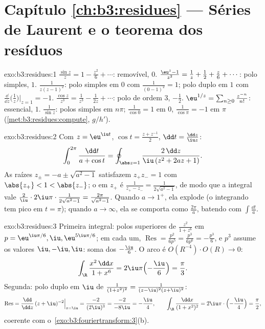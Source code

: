 \section*{Capítulo \ref{ch:b3:residues} --- Séries de Laurent e
o teorema dos resíduos}

\begin{solution}{exo:b3:residues:1}
$\frac{\sin z}z = 1 - \frac{z^2}6 + \cdots$: removível,
 $0$. $\frac{\eu^z - 1}{z^2} = \frac1z + \frac12 +
\frac z6 + \cdots$: polo simples,  $1$.
$\frac1{z(z-1)^2}$: polo simples em $0$ com 
$\frac1{(0-1)^2} = 1$; polo duplo em $1$ com 
$\frac{\dd}{\dd z}\bigl(\frac1z\bigr)\big|_{z=1} = -1$.
$\frac{\cos z}{z^3} = \frac1{z^3} - \frac1{2z} + \cdots$: polo
de ordem $3$,  $-\frac12$. $\eu^{1/z} = \sum_{n\geq0}
\frac{z^{-n}}{n!}$: essencial,  $1$. $\frac1{\sin z}$:
polos simples em $n\pi$;  $\frac1{\cos 0} = 1$ em $0$,
$\frac1{\cos\pi} = -1$ em $\pi$
(\cref{met:b3:residues:compute}, $g/h'$).
\end{solution}

\begin{solution}{exo:b3:residues:2}
Com $z = \eu^{\iu t}$, $\cos t = \frac{z + z^{-1}}2$, $\dd t
= \frac{\dd z}{\iu z}$:
\[
\int_0^{2\pi}\frac{\dd t}{a + \cos t}
= \oint_{\abs z = 1}\frac{2\,\dd z}{\iu\,(z^2 + 2az + 1)} .
\]
As raízes $z_\pm = -a \pm \sqrt{a^2 - 1}$ satisfazem $z_+z_- =
1$ com $\abs{z_+} < 1 < \abs{z_-}$; o  em $z_+$ é
$\frac{1}{z_+ - z_-} = \frac1{2\sqrt{a^2-1}}$, de modo que a integral
vale $\frac2\iu\cdot2\iu\pi\cdot\frac1{2\sqrt{a^2-1}} =
\frac{2\pi}{\sqrt{a^2-1}}$. Quando $a \to 1^+$, ela explode (o
integrando tem pico em $t = \pi$); quando $a \to \infty$, ela se comporta
como $\frac{2\pi}a$, batendo com $\int\frac{\dd t}a$.
\end{solution}

\begin{solution}{exo:b3:residues:3}
Primeira integral: polos superiores de $\frac{z^2}{1+z^6}$ em $p =
\eu^{\iu\pi/6}, \iu, \eu^{5\iu\pi/6}$; em cada um,
$\operatorname{Res} = \frac{p^2}{6p^5} = \frac{p^3}{6p^6} =
-\frac{p^3}6$, e $p^3$ assume os valores $\iu, -\iu, \iu$:
soma dos  $-\frac{\iu}{6}$. O arco é
$O(R^{-4})\cdot O(R) \to 0$:
\[
\int_\R\frac{x^2\,\dd x}{1 + x^6} =
2\iu\pi\Bigl(-\frac \iu6\Bigr) = \frac\pi3 .
\]
Segunda: polo duplo em $\iu$ de $\frac1{(1+z^2)^2} =
\frac1{(z-\iu)^2(z+\iu)^2}$:
\[
\operatorname{Res} = \frac{\dd}{\dd z}\,(z +
\iu)^{-2}\Big|_{z=\iu} = \frac{-2}{(2\iu)^3} =
\frac{-2}{-8\iu} = -\frac\iu4,
\qquad
\int_\R\frac{\dd x}{(1+x^2)^2} =
2\iu\pi\cdot\Bigl(-\frac\iu4\Bigr) = \frac\pi2 ,
\]
coerente com o~\cref{exo:b3:fouriertransform:3}(b).
\end{solution}

